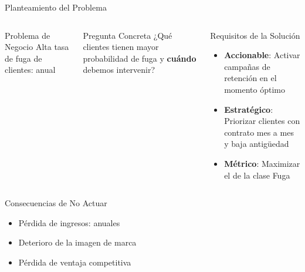 
\begin{frame}{Planteamiento del Problema}
    \begin{columns}[t]
        \begin{block}{Problema de Negocio}
            \centering
            Alta tasa de fuga de clientes: \highlight{\churnrate} anual
        \end{block}
        
        \vsp
        \begin{questionblock}{Pregunta Concreta}
            ¿Qué clientes tienen mayor probabilidad de fuga y \textbf{cuándo} debemos intervenir?
        \end{questionblock}
        
        \begin{exampleblock}{Requisitos de la Solución}
            \begin{itemize}
                \item \textbf{Accionable}: Activar campañas de retención en el momento óptimo
                \item \textbf{Estratégico}: Priorizar clientes con contrato mes a mes y baja antigüedad
                \item \textbf{Métrico}: Maximizar el  de la clase Fuga
            \end{itemize}
        \end{exampleblock}
    \end{columns}
    
    \vsp
    \begin{alertblock}{Consecuencias de No Actuar}
        \begin{itemize}
            \item Pérdida de ingresos:  anuales
            \item Deterioro de la imagen de marca
            \item Pérdida de ventaja competitiva
        \end{itemize}
    \end{alertblock}
\end{frame}

